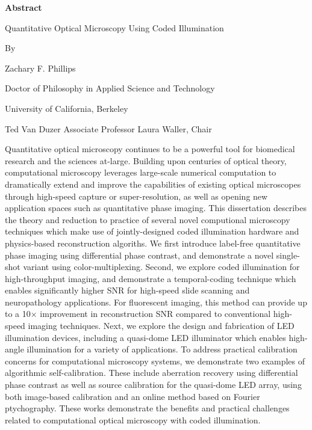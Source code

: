 \begin{center}
    \textbf{Abstract}

    \vspace{1.2cm}
     Quantitative Optical Microscopy Using Coded Illumination

    \vspace{0.4cm}

    By

    \vspace{0.4cm}
    Zachary F. Phillips

     \vspace{0.4cm}
     Doctor of Philosophy in Applied Science and Technology

     \vspace{0.4cm}
     University of California, Berkeley

     \vspace{0.4cm}
     Ted Van Duzer Associate Professor Laura Waller, Chair

    \vspace{0.8cm}


\end{center}

Quantitative optical microscopy continues to be a powerful tool for biomedical research and the sciences at-large. Building upon centuries of optical theory, computational microscopy leverages large-scale numerical computation to dramatically extend and improve the capabilities of existing optical microscopes through high-speed capture or super-resolution, as well as opening new application spaces such as quantitative phase imaging. This dissertation describes the theory and reduction to practice of several novel computional microscopy techniques which make use of jointly-designed coded illumination hardware and physics-based reconstruction algoriths. We first introduce label-free quantitative phase imaging using differential phase contrast, and demonstrate a novel single-shot variant using color-multiplexing. Second, we explore coded illumination for high-throughput imaging, and demonstrate a temporal-coding technique which enables significantly higher SNR for high-speed slide scanning and neuropathology applications. For fluorescent imaging, this method can provide up to a 10$\times$ improvement in reconstruction SNR compared to conventional high-speed imaging techniques. Next, we explore the design and fabrication of LED illumination devices, including a quasi-dome LED illuminator which enables high-angle illumination for a variety of applications. To address practical calibration concerns for computational microscopy systems, we demonstrate two examples of algorithmic self-calibration. These include aberration recovery using differential phase contrast as well as source calibration for the quasi-dome LED array, using both image-based calibration and an online method based on Fourier ptychography. These works demonstrate the benefits and practical challenges related to computational optical microscopy with coded illumination.

